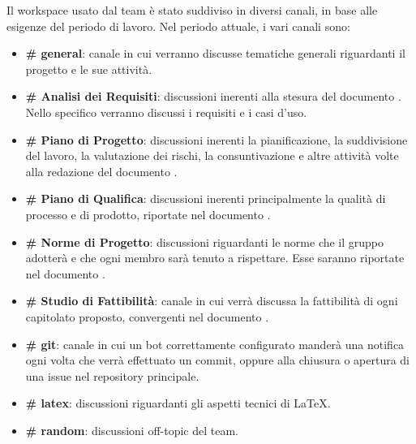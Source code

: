 			Il workspace usato dal team è stato suddiviso in diversi canali, in base alle esigenze del periodo di lavoro. Nel periodo attuale, i vari canali sono:
			\begin{itemize}
				\item \textbf{\# general}: canale in cui verranno discusse tematiche generali riguardanti il progetto e le sue attività.
				\item \textbf{\# Analisi dei Requisiti}: discussioni inerenti alla stesura del documento \Doc{\AdR}. Nello specifico verranno discussi
					 i requisiti e i casi d'uso.
				\item \textbf{\# Piano di Progetto}: discussioni inerenti la pianificazione, la suddivisione del lavoro, la valutazione dei rischi, la consuntivazione e
					altre attività volte alla redazione del documento \Doc{\PdP}.
				\item \textbf{\# Piano di Qualifica}: discussioni inerenti principalmente la qualità di processo e di prodotto, riportate nel documento \Doc{\PdQ}.
				\item \textbf{\# Norme di Progetto}: discussioni riguardanti le norme che il gruppo adotterà e che ogni membro sarà tenuto a rispettare. Esse
					saranno riportate nel documento \Doc{\NdP}.
				\item \textbf{\# Studio di Fattibilità}: canale in cui verrà discussa la fattibilità di ogni capitolato proposto, convergenti nel documento
					\Doc{\SdF}.
				\item \textbf{\# git}: canale in cui un bot correttamente configurato manderà una notifica ogni volta che verrà effettuato un commit, oppure alla chiusura o apertura
					di una issue nel repository principale.
				\item \textbf{\# latex}: discussioni riguardanti gli aspetti tecnici di \LaTeX.
				\item \textbf{\# random}: discussioni off-topic del team.
			\end{itemize}

